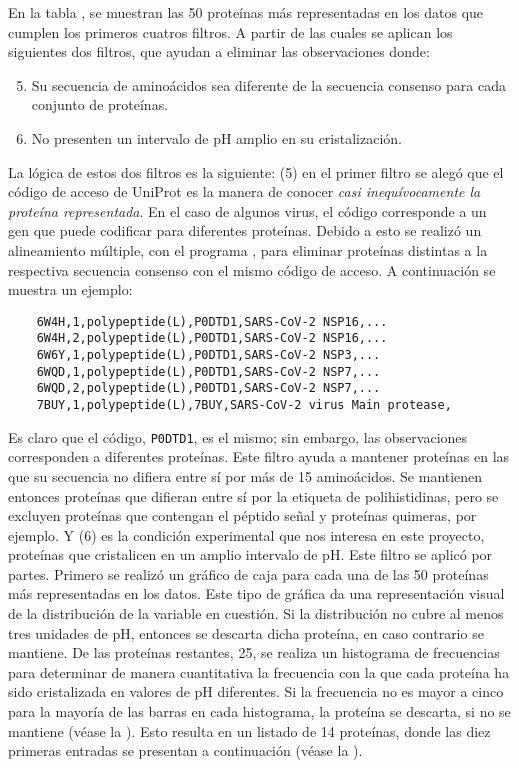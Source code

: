 En la tabla , se muestran las 50 proteínas más representadas en los datos que cumplen los primeros cuatros filtros. A partir de las cuales se aplican los siguientes dos filtros, que ayudan a eliminar las observaciones donde:

\begin{enumerate}
	\setcounter{enumi}{4}
	\item Su secuencia de aminoácidos sea diferente de la secuencia consenso para cada conjunto de proteínas.
	\item No presenten un intervalo de pH amplio en su cristalización.
\end{enumerate}

La lógica de estos dos filtros es la siguiente: (\num{5}) en el primer filtro se alegó que el código de acceso de UniProt es la manera de conocer \emph{casi inequívocamente la proteína representada}. En el caso de algunos virus, el código corresponde a un gen que puede codificar para diferentes proteínas. Debido a esto se realizó un alineamiento múltiple, con el programa  ,  para eliminar proteínas distintas a la respectiva secuencia consenso con el mismo código de acceso. A continuación se muestra un ejemplo:

\begin{kaobox}[frametitle=Ejemplo 2]
	\begin{verbatim}
	6W4H,1,polypeptide(L),P0DTD1,SARS-CoV-2 NSP16,...
	6W4H,2,polypeptide(L),P0DTD1,SARS-CoV-2 NSP16,...
	6W6Y,1,polypeptide(L),P0DTD1,SARS-CoV-2 NSP3,...
	6WQD,1,polypeptide(L),P0DTD1,SARS-CoV-2 NSP7,...
	6WQD,2,polypeptide(L),P0DTD1,SARS-CoV-2 NSP7,...
	7BUY,1,polypeptide(L),7BUY,SARS-CoV-2 virus Main protease,
	\end{verbatim}
\end{kaobox}

Es claro que el código, \texttt{P0DTD1}, es el mismo; sin embargo, las observaciones corresponden a diferentes proteínas. Este filtro ayuda a mantener proteínas en las que su secuencia no difiera entre sí por más de 15 aminoácidos. Se mantienen entonces proteínas que difieran entre sí por la etiqueta de polihistidinas, pero se excluyen proteínas que contengan el péptido señal y proteínas quimeras, por ejemplo. Y (\num{6}) es la condición experimental que nos interesa en este proyecto, proteínas que cristalicen en un amplio intervalo de pH. Este filtro se aplicó por partes. Primero se realizó un gráfico de caja para cada una de las 50 proteínas más representadas en los datos. Este tipo de gráfica da una representación visual de la distribución de la variable en cuestión. Si la distribución no cubre al menos tres unidades de pH, entonces se descarta dicha proteína, en caso contrario se mantiene. De las proteínas restantes, 25, se realiza un histograma de frecuencias para determinar de manera cuantitativa la frecuencia con la que cada proteína ha sido cristalizada en valores de pH diferentes. Si la frecuencia no es mayor a cinco para la mayoría de las barras en cada histograma, la proteína se descarta, si no se mantiene (véase la ). Esto resulta en un listado de 14 proteínas, donde las diez primeras entradas se presentan a continuación (véase la ). 

